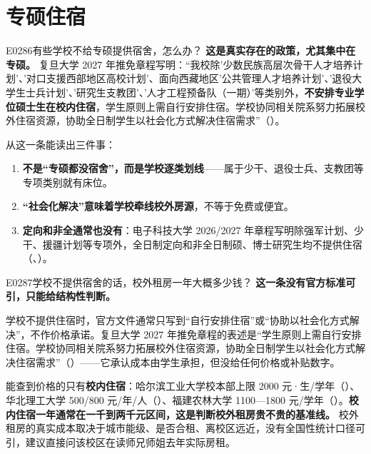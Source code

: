 \section{专硕住宿}
\begin{qa}{E0286}{有些学校不给专硕提供宿舍，怎么办？}
\textbf{这是真实存在的政策，尤其集中在专硕。} 复旦大学 2027 年推免章程写明：“我校除'少数民族高层次骨干人才培养计划'、'对口支援西部地区高校计划'、面向西藏地区'公共管理人才培养计划'、'退役大学生士兵计划'、'研究生支教团'、'人才工程预备队（一期）'等类别外，\textbf{不安排专业学位硕士生在校内住宿}，学生原则上需自行安排住宿。学校协同相关院系努力拓展校外住宿资源，协助全日制学生以社会化方式解决住宿需求”（）。

从这一条能读出三件事：

\begin{enumerate}
  \item \textbf{不是“专硕都没宿舍”，而是学校逐类划线}——属于少干、退役士兵、支教团等专项类别就有床位。
  \item \textbf{“社会化解决”意味着学校牵线校外房源}，不等于免费或便宜。
  \item \textbf{定向和非全通常也没有}：电子科技大学 2026/2027 年章程写明除强军计划、少干、援疆计划等专项外，全日制定向和非全日制硕、博士研究生均不提供住宿（、）。
\end{enumerate}
\end{qa}

\begin{qa}{E0287}{学校不提供宿舍的话，校外租房一年大概多少钱？}
\textbf{这一条没有官方标准可引，只能给结构性判断。}

学校不提供住宿时，官方文件通常只写到“自行安排住宿”或“协助以社会化方式解决”，不作价格承诺。复旦大学 2027 年推免章程的表述是“学生原则上需自行安排住宿。学校协同相关院系努力拓展校外住宿资源，协助全日制学生以社会化方式解决住宿需求”（）——它承认成本由学生承担，但没给任何价格或补贴数字。

能查到价格的只有\textbf{校内住宿}：哈尔滨工业大学校本部上限 2000 元·生/学年（）、华北理工大学 500/800 元/年/人（）、福建农林大学 1100—1800 元/学年（）。\textbf{校内住宿一年通常在一千到两千元区间，这是判断校外租房贵不贵的基准线。} 校外租房的真实成本取决于城市能级、是否合租、离校区远近，没有全国性统计口径可引，建议直接问该校区在读师兄师姐去年实际房租。
\end{qa}

